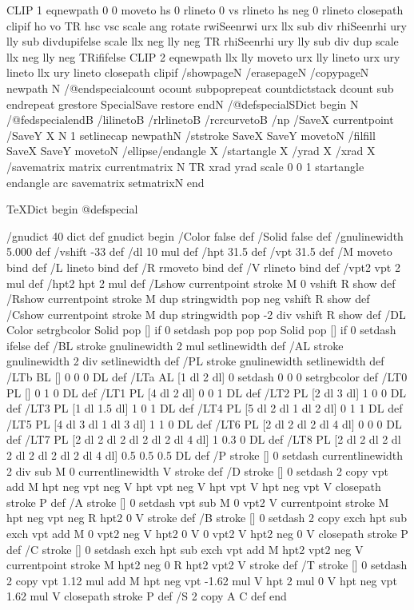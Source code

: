 {CLIP 1 eq{newpath 0 0 moveto hs 0 rlineto 0 vs rlineto hs neg 0 rlineto
closepath clip}if ho vo TR hsc vsc scale ang rotate rwiSeen{rwi urx llx
sub div rhiSeen{rhi ury lly sub div}{dup}ifelse scale llx neg lly neg TR
}{rhiSeen{rhi ury lly sub div dup scale llx neg lly neg TR}if}ifelse
CLIP 2 eq{newpath llx lly moveto urx lly lineto urx ury lineto llx ury
lineto closepath clip}if /showpage{}N /erasepage{}N /copypage{}N newpath
}N /@endspecial{count ocount sub{pop}repeat countdictstack dcount sub{
end}repeat grestore SpecialSave restore end}N /@defspecial{SDict begin}
N /@fedspecial{end}B /li{lineto}B /rl{rlineto}B /rc{rcurveto}B /np{
/SaveX currentpoint /SaveY X N 1 setlinecap newpath}N /st{stroke SaveX
SaveY moveto}N /fil{fill SaveX SaveY moveto}N /ellipse{/endangle X
/startangle X /yrad X /xrad X /savematrix matrix currentmatrix N TR xrad
yrad scale 0 0 1 startangle endangle arc savematrix setmatrix}N end

TeXDict begin @defspecial

 /gnudict 40 dict def gnudict begin /Color false def /Solid false def
/gnulinewidth 5.000 def /vshift -33 def /dl {10 mul} def /hpt 31.5
def /vpt 31.5 def /M {moveto} bind def /L {lineto} bind def /R {rmoveto}
bind def /V {rlineto} bind def /vpt2 vpt 2 mul def /hpt2 hpt 2 mul
def /Lshow { currentpoint stroke M 0 vshift R show } def /Rshow { currentpoint
stroke M dup stringwidth pop neg vshift R show } def /Cshow { currentpoint
stroke M dup stringwidth pop -2 div vshift R show } def /DL { Color
{setrgbcolor Solid {pop []} if 0 setdash } {pop pop pop Solid {pop
[]} if 0 setdash} ifelse } def /BL { stroke gnulinewidth 2 mul setlinewidth
} def /AL { stroke gnulinewidth 2 div setlinewidth } def /PL { stroke
gnulinewidth setlinewidth } def /LTb { BL [] 0 0 0 DL } def /LTa {
AL [1 dl 2 dl] 0 setdash 0 0 0 setrgbcolor } def /LT0 { PL [] 0 1 0
DL } def /LT1 { PL [4 dl 2 dl] 0 0 1 DL } def /LT2 { PL [2 dl 3 dl]
1 0 0 DL } def /LT3 { PL [1 dl 1.5 dl] 1 0 1 DL } def /LT4 { PL [5
dl 2 dl 1 dl 2 dl] 0 1 1 DL } def /LT5 { PL [4 dl 3 dl 1 dl 3 dl] 1
1 0 DL } def /LT6 { PL [2 dl 2 dl 2 dl 4 dl] 0 0 0 DL } def /LT7 {
PL [2 dl 2 dl 2 dl 2 dl 2 dl 4 dl] 1 0.3 0 DL } def /LT8 { PL [2 dl
2 dl 2 dl 2 dl 2 dl 2 dl 2 dl 4 dl] 0.5 0.5 0.5 DL } def /P { stroke
[] 0 setdash currentlinewidth 2 div sub M 0 currentlinewidth V stroke
} def /D { stroke [] 0 setdash 2 copy vpt add M hpt neg vpt neg V hpt
vpt neg V hpt vpt V hpt neg vpt V closepath stroke P } def /A { stroke
[] 0 setdash vpt sub M 0 vpt2 V currentpoint stroke M hpt neg vpt neg
R hpt2 0 V stroke } def /B { stroke [] 0 setdash 2 copy exch hpt sub
exch vpt add M 0 vpt2 neg V hpt2 0 V 0 vpt2 V hpt2 neg 0 V closepath
stroke P } def /C { stroke [] 0 setdash exch hpt sub exch vpt add M
hpt2 vpt2 neg V currentpoint stroke M hpt2 neg 0 R hpt2 vpt2 V stroke
} def /T { stroke [] 0 setdash 2 copy vpt 1.12 mul add M hpt neg vpt
-1.62 mul V hpt 2 mul 0 V hpt neg vpt 1.62 mul V closepath stroke P
} def /S { 2 copy A C} def end
 
